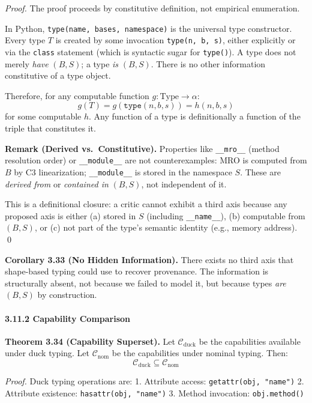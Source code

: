\emph{Proof.} The proof proceeds by constitutive definition, not empirical
enumeration.

In Python, \texttt{type(name, bases, namespace)} is the universal type
constructor. Every type \(T\) is created by some invocation
\texttt{type(n, b, s)}, either explicitly or via the \texttt{class}
statement (which is syntactic sugar for \texttt{type()}). A type does not
merely \emph{have} \((B, S)\); a type \emph{is} \((B, S)\). There is
no other information constitutive of a type object.

Therefore, for any computable function \(g : \text{Type} \to \alpha\):
\[g(T) = g(\texttt{type}(n, b, s)) = h(n, b, s)\]
for some computable \(h\). Any function of a type is definitionally a
function of the triple that constitutes it.

\textbf{Remark (Derived vs.\ Constitutive).} Properties like
\texttt{\_\_mro\_\_} (method resolution order) or \texttt{\_\_module\_\_}
are not counterexamples: MRO is computed from \(B\) by C3 linearization;
\texttt{\_\_module\_\_} is stored in the namespace \(S\). These are
\emph{derived from} or \emph{contained in} \((B, S)\), not independent
of it.

This is a definitional closure: a critic cannot exhibit a third axis
because any proposed axis is either (a) stored in \(S\) (including \texttt{\_\_name\_\_}),
(b) computable from \((B, S)\), or (c) not part of the type's semantic identity
(e.g., memory address). \qed

\textbf{Corollary 3.33 (No Hidden Information).} There exists no
third axis that shape-based typing could use to recover provenance.
The information is structurally absent, not because we failed to model
it, but because types \emph{are} \((B, S)\) by construction.

\paragraph{3.11.2 Capability Comparison}\label{capability-comparison}

\textbf{Theorem 3.34 (Capability Superset).} Let
\(\mathcal{C}_{\text{duck}}\) be the capabilities available under duck
typing. Let \(\mathcal{C}_{\text{nom}}\) be the capabilities under
nominal typing. Then:
\[\mathcal{C}_{\text{duck}} \subseteq \mathcal{C}_{\text{nom}}\]

\emph{Proof.} Duck typing operations are: 1. Attribute access:
\texttt{getattr(obj,\ "name")} 2. Attribute existence:
\texttt{hasattr(obj,\ "name")} 3. Method invocation:
\texttt{obj.method()}

